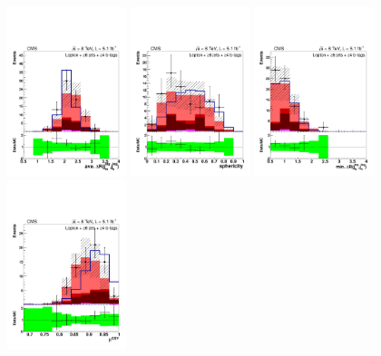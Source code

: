 \begin{figure}[hbtp]
 \begin{center}
   \includegraphics[width=0.31\textwidth]{Figures/Analysis_1_Diagrams/d2MCPlots_avg_dr_tagged_jets_cut9_jge6_tge4_Combined_HtWgt.pdf}
   \includegraphics[width=0.31\textwidth]{Figures/Analysis_1_Diagrams/d2MCPlots_sphericity_cut9_jge6_tge4_Combined_HtWgt.pdf}
   \includegraphics[width=0.31\textwidth]{Figures/Analysis_1_Diagrams/d2MCPlots_min_dr_tagged_jets_cut9_jge6_tge4_Combined_HtWgt.pdf}
   \includegraphics[width=0.31\textwidth]{Figures/Analysis_1_Diagrams/d2MCPlots_avg_btag_disc_btags_cut9_jge6_tge4_Combined_HtWgt.pdf}

\end{center}
\end{figure}
